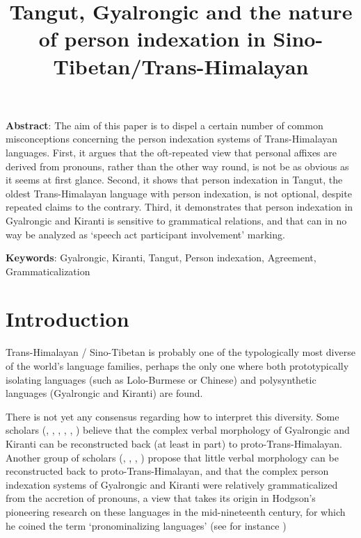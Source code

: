 \documentclass[oldfontcommands,oneside,a4paper,11pt]{article}
\begin{document}
 
\title{Tangut, Gyalrongic and the nature of person indexation in Sino-Tibetan/Trans-Himalayan}
\maketitle
\linenumbers 

\textbf{Abstract}: The aim of this paper is to dispel a certain number of common misconceptions concerning the person indexation systems of Trans-Himalayan languages. First, it argues that the oft-repeated view that personal affixes are derived from pronouns, rather than the other way round, is not be as obvious as it seems at first glance. Second, it shows that person indexation in Tangut, the oldest Trans-Himalayan language with person indexation, is not optional, despite repeated claims to the contrary. Third, it demonstrates that person indexation in Gyalrongic and Kiranti is sensitive to grammatical relations, and that can in no way be analyzed as `speech act participant involvement' marking.

\textbf{Keywords}: Gyalrongic, Kiranti, Tangut, Person indexation, Agreement, Grammaticalization

\section{Introduction}
Trans-Himalayan / Sino-Tibetan is probably one of the typologically most diverse of the world's language families, perhaps the only one where both prototypically isolating languages (such as Lolo-Burmese or Chinese) and polysynthetic languages (Gyalrongic and Kiranti) are found. 

There is not yet any consensus regarding how to interpret this diversity. Some scholars (\citealt{bauman75}, \citealt{delancey89agreement}, \citealt{driem93agreement}, \citealt{delancey10agreement}, \citealt{delancey11prefixes}, \citealt{jacques12agreement}) believe that the complex verbal morphology of Gyalrongic and Kiranti can be reconstructed back (at least in part) to proto-Trans-Himalayan. Another group of scholars (\citealt{lapolla92},  \citealt{lapolla03}, \citealt{lapolla12comments}, \citealt{zeisler15eat}) propose that little verbal morphology can be reconstructed back to proto-Trans-Himalayan, and that the complex person indexation systems of Gyalrongic and Kiranti were relatively grammaticalized from the accretion of pronouns, a view that takes its origin in Hodgson's pioneering research on these languages in the mid-nineteenth century, for which he coined the term `pronominalizing languages' (see for instance  \citealt{hodgson57sifan})
\end{document}
